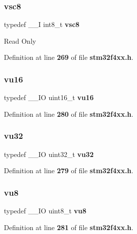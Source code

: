 \mbox{\label{group__Exported__types_ga47463bcded079ac61d5da46aff497803}} 
\subsubsection{vsc8}
{\footnotesize\ttfamily typedef \+\_\+\+\_\+I int8\+\_\+t \textbf{ vsc8}}

Read Only 

Definition at line \textbf{ 269} of file \textbf{ stm32f4xx.\+h}.

\mbox{\label{group__Exported__types_ga93d1a6b3dcfdded10a7b15548679fe0a}} 
\subsubsection{vu16}
{\footnotesize\ttfamily typedef \+\_\+\+\_\+\+IO uint16\+\_\+t \textbf{ vu16}}



Definition at line \textbf{ 280} of file \textbf{ stm32f4xx.\+h}.

\mbox{\label{group__Exported__types_ga0cd21c4793673b69ecd5fd673353a145}} 
\subsubsection{vu32}
{\footnotesize\ttfamily typedef \+\_\+\+\_\+\+IO uint32\+\_\+t \textbf{ vu32}}



Definition at line \textbf{ 279} of file \textbf{ stm32f4xx.\+h}.

\mbox{\label{group__Exported__types_ga4a8fa9a2b4796540a6d65a04eb18e111}} 
\subsubsection{vu8}
{\footnotesize\ttfamily typedef \+\_\+\+\_\+\+IO uint8\+\_\+t \textbf{ vu8}}



Definition at line \textbf{ 281} of file \textbf{ stm32f4xx.\+h}.

\mbox{\label{group__Exported__types_ga7f6037565f0caa27727c8b871daf0d56}} 
